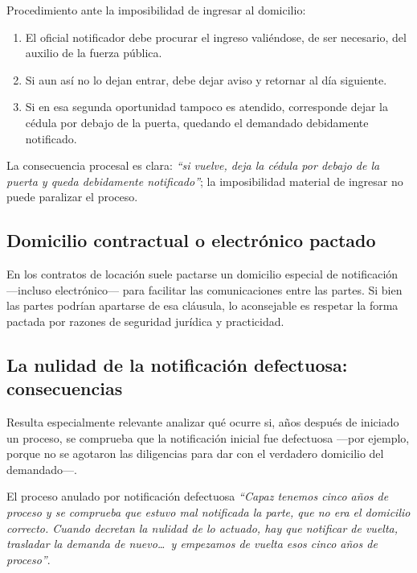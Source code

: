 \documentclass[12pt,oneside]{book}
\begin{document}
\begin{important}
Procedimiento ante la imposibilidad de ingresar al domicilio:
\begin{enumerate}
    \item El oficial notificador debe procurar el ingreso valiéndose, de ser necesario, del auxilio de la fuerza pública.
    \item Si aun así no lo dejan entrar, debe dejar aviso y retornar al día siguiente.
    \item Si en esa segunda oportunidad tampoco es atendido, corresponde dejar la cédula por debajo de la puerta, quedando el demandado debidamente notificado.
\end{enumerate}
La consecuencia procesal es clara: \textit{``si vuelve, deja la cédula por debajo de la puerta y queda debidamente notificado''}; la imposibilidad material de ingresar no puede paralizar el proceso.
\end{important}

\subsection{Domicilio contractual o electrónico pactado}

En los contratos de locación suele pactarse un domicilio especial de notificación —incluso electrónico— para facilitar las comunicaciones entre las partes. Si bien las partes podrían apartarse de esa cláusula, lo aconsejable es respetar la forma pactada por razones de seguridad jurídica y practicidad.

\subsection{La nulidad de la notificación defectuosa: consecuencias}

Resulta especialmente relevante analizar qué ocurre si, años después de iniciado un proceso, se comprueba que la notificación inicial fue defectuosa —por ejemplo, porque no se agotaron las diligencias para dar con el verdadero domicilio del demandado—.

\begin{example}{El proceso anulado por notificación defectuosa}
\textit{``Capaz tenemos cinco años de proceso y se comprueba que estuvo mal notificada la parte, que no era el domicilio correcto. Cuando decretan la nulidad de lo actuado, hay que notificar de vuelta, trasladar la demanda de nuevo\dots\ y empezamos de vuelta esos cinco años de proceso''}.
\end{example}
\end{document}
